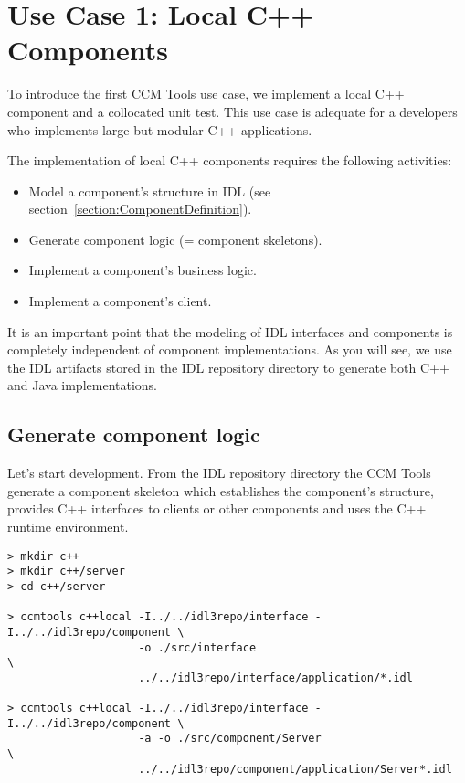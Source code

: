 \section{Use Case 1: Local C++ Components}
\label{section:LocalC++ComponentImplementation}

To introduce the first CCM Tools use case, we implement a local C++ component and a
collocated unit test. This use case is adequate for a developers who implements
large but modular C++ applications.

\vspace{3mm}
The implementation of local C++ components requires the following activities:
\begin{itemize}
	\item Model a component's structure in IDL 
			(see section~\ref{section:ComponentDefinition}). 
	\item Generate component logic (= component skeletons).
	\item Implement a component's business logic.
	\item Implement a component's client.

\end{itemize}

It is an important point that the modeling of IDL interfaces and components 
is completely independent of component implementations.
As you will see, we use the IDL artifacts stored in the IDL repository directory
to generate both C++ and Java implementations.  
 
 
\subsection{Generate component logic}
\label{subsection:GenerateComponentLogic}

Let's start development. From the IDL repository directory the CCM Tools
generate a component skeleton which establishes the component's structure,
provides C++ interfaces to clients or other components and uses the C++ runtime 
environment.

\begin{verbatim}
> mkdir c++
> mkdir c++/server
> cd c++/server

> ccmtools c++local -I../../idl3repo/interface -I../../idl3repo/component \
                    -o ./src/interface                                    \
                    ../../idl3repo/interface/application/*.idl            

> ccmtools c++local -I../../idl3repo/interface -I../../idl3repo/component \
                    -a -o ./src/component/Server                          \
                    ../../idl3repo/component/application/Server*.idl
\end{verbatim}

